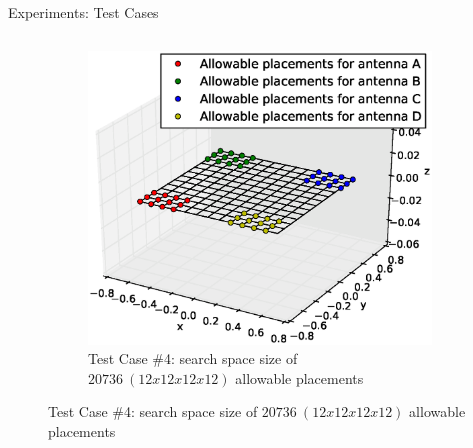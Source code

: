 \documentclass{beamer}
\begin{document}
\begin{frame}{Experiments: Test Cases}
\begin{columns}
\begin{column}{.5\columnwidth}
\begin{figure}
\begin{subfigure}{\columnwidth}
                    \includegraphics[trim=0 30 0 50, clip, scale=0.25]{../paper/FIG/tc4_figure}%
                    \caption*{\tiny Test Case \#4: search space size of $20736~(12x12x12x12)$ allowable placements}%
                \end{subfigure}\hfill%
            \end{figure}
        \end{column}
    \end{columns}
\end{frame}
\end{document}
